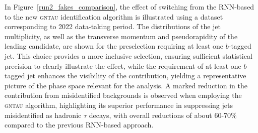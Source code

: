   In Figure~\ref{run2_fakes_comparison}, the effect of switching from the RNN-based to the new \textsc{gntau} identification algorithm is illustrated using a dataset corresponding to 2022 data-taking period.  
  The distributions of the jet multiplicity, as well as the transverse momentum and pseudorapidity of the leading \tauhad candidate, are shown for the \ttH preselection requiring at least one $b$-tagged jet.  
  This choice provides a more inclusive selection, ensuring sufficient statistical precision to clearly illustrate the effect, while the requirement of at least one $b$-tagged jet enhances the visibility of the \ttbar contribution, yielding a representative picture of the phase space relevant for the analysis.  
  A marked reduction in the contribution from misidentified \tauhad backgrounds is observed when employing the \textsc{gntau} algorithm, highlighting its superior performance in suppressing jets misidentified as hadronic $\tau$ decays, with overall reductions of about 60-70\% compared to the previous RNN-based approach.
  
